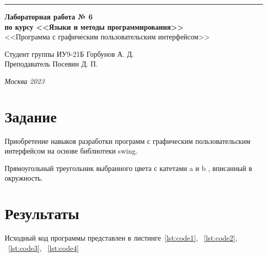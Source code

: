 \documentclass[a4paper, 14pt]{extarticle}
\begin{document}
\begin{titlepage}
\vspace*{-16pt}
\hspace{30pt}\rule{0.866\textwidth}{0.4pt}
  
\vspace{11em}

\begin{center}
\Large {\bf Лабораторная работа № 6} \\ 
\large {\bf по курсу <<Языки и методы программирования>>} \\
\large <<Программа с графическим пользовательским интерфейсом>> 
\end{center}\normalsize

\vspace{8em}


\begin{flushright}
  {Студент группы ИУ9-21Б Горбунов А. Д. \hspace*{15pt}\\ 
  \vspace{2ex}
  Преподаватель Посевин Д. П.\hspace*{15pt}}
\end{flushright}

\bigskip

\vfill
 

\begin{center}
\textsl{Москва 2023}
\end{center}
\end{titlepage}

\renewcommand{\ttdefault}{pcr}

\setlength{\tabcolsep}{3pt}
\newpage
\setcounter{page}{2}

\section{Задание}\label{Sect::task}
	Приобретение навыков разработки программ с графическим пользовательским интерфейсом на основе библиотеки swing.
 
    Прямоугольный треугольник выбранного цвета с катетами a и b , вписанный в окружность.
\section{Результаты}\label{Sect::res}

Исходный код программы представлен в листинге~\ref{lst:code1}, ~\ref{lst:code2}, ~\ref{lst:code3}, ~\ref{lst:code4}
\end{document}
